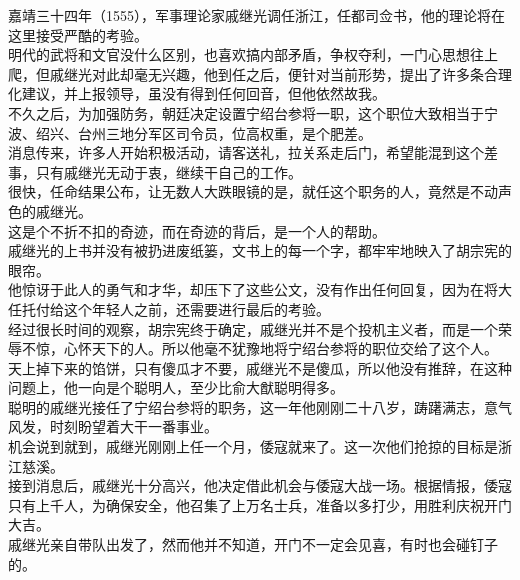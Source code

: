 \begin{multicols}{\theparacolNo}
嘉靖三十四年（1555），军事理论家戚继光调任浙江，任都司佥书，他的理论将在这里接受严酷的考验。\\

明代的武将和文官没什么区别，也喜欢搞内部矛盾，争权夺利，一门心思想往上爬，但戚继光对此却毫无兴趣，他到任之后，便针对当前形势，提出了许多条合理化建议，并上报领导，虽没有得到任何回音，但他依然故我。\\

不久之后，为加强防务，朝廷决定设置宁绍台参将一职，这个职位大致相当于宁波、绍兴、台州三地分军区司令员，位高权重，是个肥差。\\

消息传来，许多人开始积极活动，请客送礼，拉关系走后门，希望能混到这个差事，只有戚继光无动于衷，继续干自己的工作。\\

很快，任命结果公布，让无数人大跌眼镜的是，就任这个职务的人，竟然是不动声色的戚继光。\\

这是个不折不扣的奇迹，而在奇迹的背后，是一个人的帮助。\\

戚继光的上书并没有被扔进废纸篓，文书上的每一个字，都牢牢地映入了胡宗宪的眼帘。\\

他惊讶于此人的勇气和才华，却压下了这些公文，没有作出任何回复，因为在将大任托付给这个年轻人之前，还需要进行最后的考验。\\

经过很长时间的观察，胡宗宪终于确定，戚继光并不是个投机主义者，而是一个荣辱不惊，心怀天下的人。所以他毫不犹豫地将宁绍台参将的职位交给了这个人。\\

天上掉下来的馅饼，只有傻瓜才不要，戚继光不是傻瓜，所以他没有推辞，在这种问题上，他一向是个聪明人，至少比俞大猷聪明得多。\\

聪明的戚继光接任了宁绍台参将的职务，这一年他刚刚二十八岁，踌躇满志，意气风发，时刻盼望着大干一番事业。\\

机会说到就到，戚继光刚刚上任一个月，倭寇就来了。这一次他们抢掠的目标是浙江慈溪。\\

接到消息后，戚继光十分高兴，他决定借此机会与倭寇大战一场。根据情报，倭寇只有上千人，为确保安全，他召集了上万名士兵，准备以多打少，用胜利庆祝开门大吉。\\

戚继光亲自带队出发了，然而他并不知道，开门不一定会见喜，有时也会碰钉子的。\\


\end{multicols}
